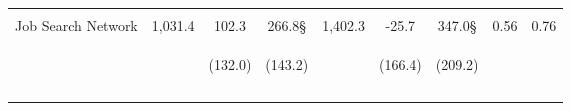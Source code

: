 \begin{tabular}{lcccccccc}
 & \begin{footnotesize}\end{footnotesize} & \begin{footnotesize}[1.000]\end{footnotesize} & \begin{footnotesize}[0.022]\end{footnotesize} & \begin{footnotesize}\end{footnotesize} & \begin{footnotesize}[1.000]\end{footnotesize} & \begin{footnotesize}[0.643]\end{footnotesize} & \begin{footnotesize}\end{footnotesize} & \begin{footnotesize}\end{footnotesize}\\
\noalign{\smallskip}Job Search Network & 1,031.4 & 102.3 & 266.8§ & 1,402.3 & -25.7 & 347.0§ & 0.56 & 0.76\\
 & \begin{footnotesize}\end{footnotesize} & \begin{footnotesize}(132.0)\end{footnotesize} & \begin{footnotesize}(143.2)\end{footnotesize} & \begin{footnotesize}\end{footnotesize} & \begin{footnotesize}(166.4)\end{footnotesize} & \begin{footnotesize}(209.2)\end{footnotesize} & \begin{footnotesize}\end{footnotesize} & \begin{footnotesize}\end{footnotesize}\\
 & \begin{footnotesize}\end{footnotesize} & \begin{footnotesize}[1.000]\end{footnotesize} & \begin{footnotesize}[0.049]\end{footnotesize} & \begin{footnotesize}\end{footnotesize} & \begin{footnotesize}[1.000]\end{footnotesize} & \begin{footnotesize}[0.301]\end{footnotesize} & \begin{footnotesize}\end{footnotesize} & \begin{footnotesize}\end{footnotesize}\\
\noalign{\smallskip}\hline\end{tabular}\\
